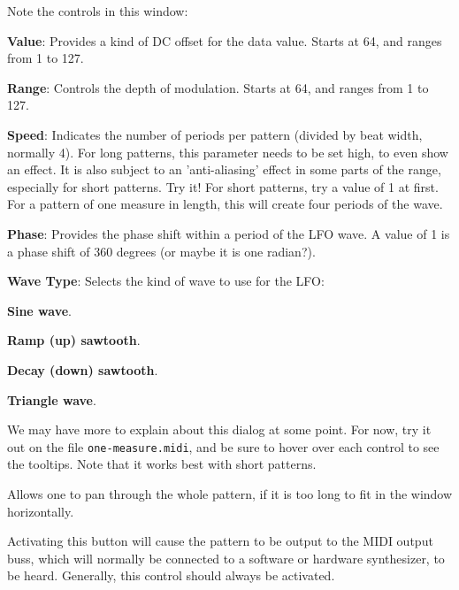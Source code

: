   Note the controls in this window:

   \begin{enumber}
      \item \textbf{Value}:
         Provides a kind of DC offset for the data value. Starts at 64, and
         ranges from 1 to 127.
      \item \textbf{Range}:
         Controls the depth of modulation. Starts at 64, and ranges from 1 to
         127.
      \item \textbf{Speed}:
         Indicates the number of periods per pattern (divided by beat width,
         normally 4).  For long patterns, this parameter needs to be set high,
         to even show an effect.  It is also subject to an 'anti-aliasing'
         effect in some parts of the range, especially for short patterns.
         Try it!  For short patterns, try a value of 1 at first.  For a pattern
         of one measure in length, this will create four periods of the wave.
      \item \textbf{Phase}:
         Provides the phase shift within a period of the LFO wave.
         A value of 1 is a phase shift of 360 degrees (or maybe it is one
         radian?).
      \item \textbf{Wave Type}:
         Selects the kind of wave to use for the LFO:
         \begin{enumber}
            \item \textbf{Sine wave}.
            \item \textbf{Ramp (up) sawtooth}.
            \item \textbf{Decay (down) sawtooth}.
            \item \textbf{Triangle wave}.
         \end{enumber}
   \end{enumber}

   We may have more to explain about this dialog at some point.  For now,
   try it out on the file \texttt{one-measure.midi}, and be sure to hover over
   each control to see the tooltips.
   Note that it works best with short patterns.

   Allows one to pan through the whole pattern, if it is too long to fit in
   the window horizontally.

   Activating this button will cause the pattern to be output to the MIDI
   output buss, which will normally be connected to a software or hardware
   synthesizer, to be heard.
   Generally, this control should always be activated.

